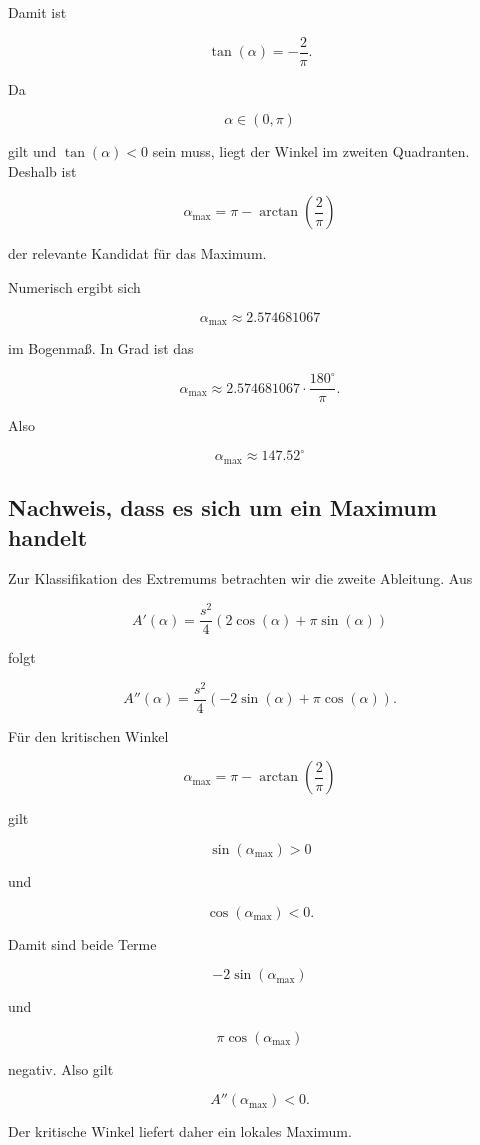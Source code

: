 Damit ist

\[
\tan(\alpha)
=
-\frac{2}{\pi}.
\]

Da

\[
\alpha\in(0,\pi)
\]

gilt und \(\tan(\alpha)<0\) sein muss, liegt der Winkel im zweiten
Quadranten. Deshalb ist

\[
\boxed{
\alpha_\text{max}
=
\pi
-
\arctan\left(\frac{2}{\pi}\right)
}
\]

der relevante Kandidat für das Maximum.

Numerisch ergibt sich

\[
\alpha_\text{max}
\approx
2.574681067
\]

im Bogenmaß. In Grad ist das

\[
\alpha_\text{max}
\approx
2.574681067
\cdot
\frac{180^\circ}{\pi}.
\]

Also

\[
\boxed{
\alpha_\text{max}
\approx
147.52^\circ
}
\]

\subsection{Nachweis, dass es sich um ein Maximum handelt}

Zur Klassifikation des Extremums betrachten wir die zweite Ableitung.
Aus

\[
A'(\alpha)
=
\frac{s^2}{4}
\left(
2\cos(\alpha)
+
\pi\sin(\alpha)
\right)
\]

folgt

\[
A''(\alpha)
=
\frac{s^2}{4}
\left(
-2\sin(\alpha)
+
\pi\cos(\alpha)
\right).
\]

Für den kritischen Winkel

\[
\alpha_\text{max}
=
\pi
-
\arctan\left(\frac{2}{\pi}\right)
\]

gilt

\[
\sin(\alpha_\text{max})>0
\]

und

\[
\cos(\alpha_\text{max})<0.
\]

Damit sind beide Terme

\[
-2\sin(\alpha_\text{max})
\]

und

\[
\pi\cos(\alpha_\text{max})
\]

negativ. Also gilt

\[
A''(\alpha_\text{max})<0.
\]

Der kritische Winkel liefert daher ein lokales Maximum.

